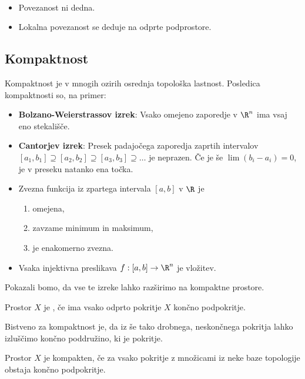 \begin{opomba}
    \
    \begin{itemize}
        \item Povezanost ni dedna.
        \item Lokalna povezanost se deduje na odprte podprostore.
    \end{itemize}
\end{opomba}

\subsection{Kompaktnost}
Kompaktnost je v mnogih ozirih osrednja topološka lastnost. Posledica kompaktnosti so, na primer:
\begin{itemize}
    \item \textbf{Bolzano-Weierstrassov izrek}: Vsako omejeno zaporedje v $\R^n$ ima vsaj eno stekališče.
    \item \textbf{Cantorjev izrek}: Presek padajočega zaporedja zaprtih intervalov $[a_1, b_1] \supseteq [a_2, b_2] \supseteq [a_3, b_3] \supseteq \ldots$ je neprazen. Če je še $\lim(b_i - a_i) = 0$, je v preseku natanko ena točka.
    \item Zvezna funkcija iz zpartega intervala $[a,b]$ v $\R$ je 
    \begin{enumerate}
        \item omejena,
        \item zavzame minimum in maksimum,
        \item je enakomerno zvezna.
    \end{enumerate}
    \item Vsaka injektivna preslikava $f: [a,b] \to \R^n$ je vložitev.
\end{itemize}

Pokazali bomo, da vse te izreke lahko razširimo na kompaktne prostore.

\begin{definicija}
    Prostor $X$ je , če ima vsako odprto pokritje $X$ končno podpokritje.
\end{definicija}

\begin{opomba}
    Bistveno za kompaktnost je, da iz še tako drobnega, neskončnega pokritja lahko izluščimo končno poddružino, ki je pokritje.
\end{opomba}

\begin{trditev}
    Prostor $X$ je kompakten, če za vsako pokritje z množicami iz neke baze topologije obstaja končno podpokritje.
\end{trditev}

